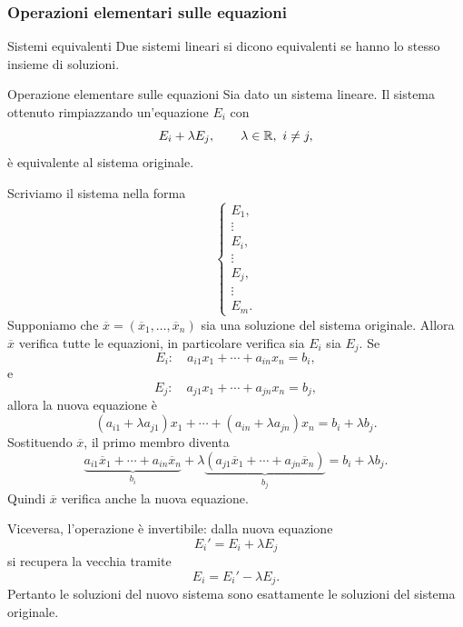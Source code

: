 \documentclass[a4paper]{article}
\begin{document}
\subsubsection{Operazioni elementari sulle equazioni}

\begin{snippetdefinition}{Sistemi equivalenti}
    Due sistemi lineari si dicono equivalenti se hanno lo stesso insieme di soluzioni.
\end{snippetdefinition}

\begin{snippetlemma}{Operazione elementare sulle equazioni}
    Sia dato un sistema lineare. Il sistema ottenuto rimpiazzando un'equazione \(E_i\) con
    \[
        E_i+\lambda E_j,
        \qquad
        \lambda\in\mathbb{R},\ i\neq j,
    \]
    è equivalente al sistema originale.
\end{snippetlemma}

\begin{snippetproof}{}
    Scriviamo il sistema nella forma
    \[
        \begin{cases}
            E_1,\\
            \vdots\\
            E_i,\\
            \vdots\\
            E_j,\\
            \vdots\\
            E_m.
        \end{cases}
    \]
    Supponiamo che \(\overline{x}=(\overline{x}_1,\ldots,\overline{x}_n)\) sia una soluzione del sistema originale. Allora \(\overline{x}\) verifica tutte le equazioni, in particolare verifica sia \(E_i\) sia \(E_j\). Se
    \[
        E_i:\quad a_{i1}x_1+\cdots+a_{in}x_n=b_i,
    \]
    e
    \[
        E_j:\quad a_{j1}x_1+\cdots+a_{jn}x_n=b_j,
    \]
    allora la nuova equazione è
    \[
        (a_{i1}+\lambda a_{j1})x_1+\cdots+(a_{in}+\lambda a_{jn})x_n
        =
        b_i+\lambda b_j.
    \]
    Sostituendo \(\overline{x}\), il primo membro diventa
    \[
        \underbrace{a_{i1}\overline{x}_1+\cdots+a_{in}\overline{x}_n}_{b_i}
        +
        \lambda
        \underbrace{(a_{j1}\overline{x}_1+\cdots+a_{jn}\overline{x}_n)}_{b_j}
        =
        b_i+\lambda b_j.
    \]
    Quindi \(\overline{x}\) verifica anche la nuova equazione.

    Viceversa, l'operazione è invertibile: dalla nuova equazione
    \[
        E_i' = E_i+\lambda E_j
    \]
    si recupera la vecchia tramite
    \[
        E_i=E_i'-\lambda E_j.
    \]
    Pertanto le soluzioni del nuovo sistema sono esattamente le soluzioni del sistema originale.
\end{snippetproof}
\end{document}
